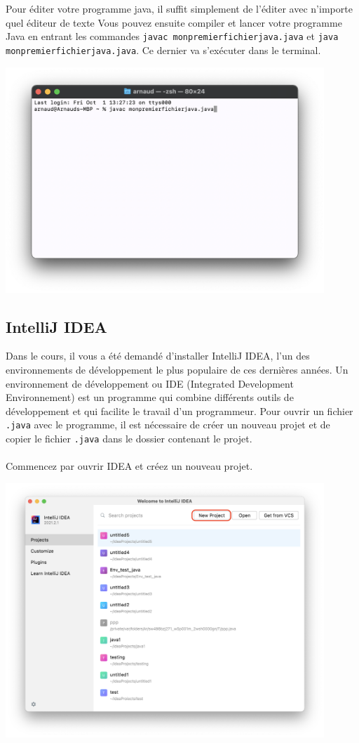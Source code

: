 Pour éditer votre programme java, il suffit simplement de l'éditer avec n'importe quel éditeur de texte
Vous pouvez ensuite compiler et lancer votre programme Java en entrant les commandes \lstinline{javac monpremierfichierjava.java} et \lstinline{java monpremierfichierjava.java}. Ce dernier va s'exécuter dans le terminal.
\begin{center}
	\includegraphics[width=12cm]{4j}	
\end{center}
 

\subsection{IntelliJ IDEA}

Dans le cours, il vous a été demandé d'installer IntelliJ IDEA, l'un des environnements de développement le plus populaire de ces dernières années. Un environnement de développement ou IDE (Integrated Development Environnement) est un programme qui combine différents outils de développement et qui facilite le travail d'un programmeur. Pour ouvrir un fichier \lstinline{.java} avec le programme, il est nécessaire de créer un nouveau projet et de copier le fichier \lstinline{.java} dans le dossier contenant le projet.
\\\\
Commencez par ouvrir IDEA et créez un nouveau projet.

\begin{center}
	\includegraphics[width=12cm]{5j}	
\end{center}
 


